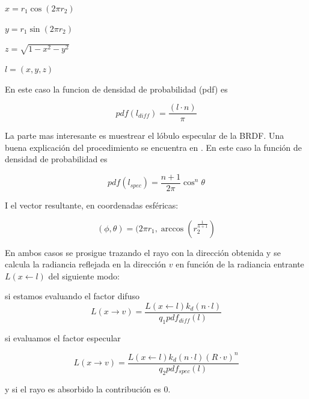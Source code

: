 \smallskip

$x = r_1 \cos (2\pi r_2)$

\smallskip

$y = r_1 \sin (2\pi r_2)$

\smallskip

$z = \sqrt{1 - x^2 - y^2}$

\smallskip

$l = (x, y, z)$

\medskip

En este caso la funcion de densidad de probabilidad (pdf) es

\smallskip

\begin{equation}
pdf(l_{diff}) = \frac{(l \cdot n)}{\pi}
\end{equation}

La parte mas interesante es muestrear el lóbulo especular de la BRDF. Una buena explicación del procedimiento se encuentra en \cite{Lafortune1994}. En este caso la función de densidad de probabilidad es

\begin{equation}
pdf(l_{spec}) = \frac{n + 1}{2\pi}\cos^n\theta
\end{equation}

I el vector resultante, en coordenadas esféricas:

\begin{equation}
(\phi, \theta) = (2\pi r_1, \arccos(r_2^{\frac{1}{n+1}}) 
\end{equation}

En ambos casos se prosigue trazando el rayo con la dirección obtenida y se calcula la radiancia reflejada en la dirección $v$ en función de la radiancia entrante $L(x \gets l)$ del siguiente modo:
\medskip

si estamos evaluando el factor difuso
\begin{equation}
L(x \to v) = \frac{L(x \gets l)k_d(n \cdot l)}{q_1 pdf_{diff}(l)}
\end{equation}

si evaluamos el factor especular

\begin{equation}
L(x \to v) = \frac{L(x \gets l)k_d(n \cdot l)(R \cdot v)^n}{q_2 pdf_{spec}(l)}
\end{equation}

y si el rayo es absorbido la contribución es 0.




\clearpage

